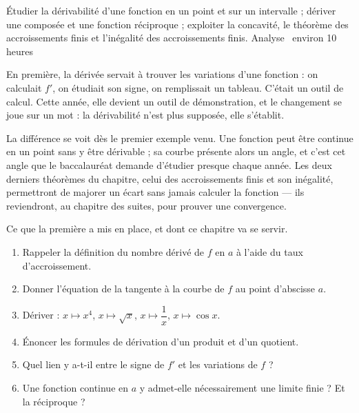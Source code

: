   {Étudier la dérivabilité d'une fonction en un point et sur un intervalle ;
   dériver une composée et une fonction réciproque ; exploiter la concavité, le
   théorème des accroissements finis et l'inégalité des accroissements finis.}
  {Analyse \textbullet\ environ 10 heures}

En première, la dérivée servait à trouver les variations d'une fonction : on
calculait $f'$, on étudiait son signe, on remplissait un tableau. C'était un
outil de calcul. Cette année, elle devient un outil de démonstration, et le
changement se joue sur un mot : la dérivabilité n'est plus supposée, elle
s'établit.

La différence se voit dès le premier exemple venu. Une fonction peut être
continue en un point sans y être dérivable ; sa courbe présente alors un
angle, et c'est cet angle que le baccalauréat demande d'étudier presque chaque
année. Les deux derniers théorèmes du chapitre, celui des accroissements finis
et son inégalité, permettront de majorer un écart sans jamais calculer la
fonction — ils reviendront, au chapitre des suites, pour prouver une
convergence.

\begin{revision}
Ce que la première a mis en place, et dont ce chapitre va se servir.

\begin{enumerate}[label=\textbf{\arabic*.}, leftmargin=*, itemsep=0.35em]
  \item Rappeler la définition du nombre dérivé de $f$ en $a$ à l'aide du taux
        d'accroissement.
  \item Donner l'équation de la tangente à la courbe de $f$ au point
        d'abscisse $a$.
  \item Dériver : $x \mapsto x^{4}$, $x \mapsto \sqrt{x}$,
        $x \mapsto \dfrac{1}{x}$, $x \mapsto \cos x$.
  \item Énoncer les formules de dérivation d'un produit et d'un quotient.
  \item Quel lien y a-t-il entre le signe de $f'$ et les variations de $f$ ?
  \item Une fonction continue en $a$ y admet-elle nécessairement une limite
        finie ? Et la réciproque ?
\end{enumerate}
\end{revision}

